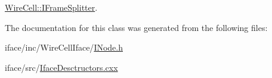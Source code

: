 \hyperlink{class_wire_cell_1_1_i_frame_splitter_aab4f057f5241c5c8f6b688450741daec}{Wire\+Cell\+::\+I\+Frame\+Splitter}.



The documentation for this class was generated from the following files\+:\begin{DoxyCompactItemize}
\item 
iface/inc/\+Wire\+Cell\+Iface/\hyperlink{_i_node_8h}{I\+Node.\+h}\item 
iface/src/\hyperlink{_iface_desctructors_8cxx}{Iface\+Desctructors.\+cxx}\end{DoxyCompactItemize}
